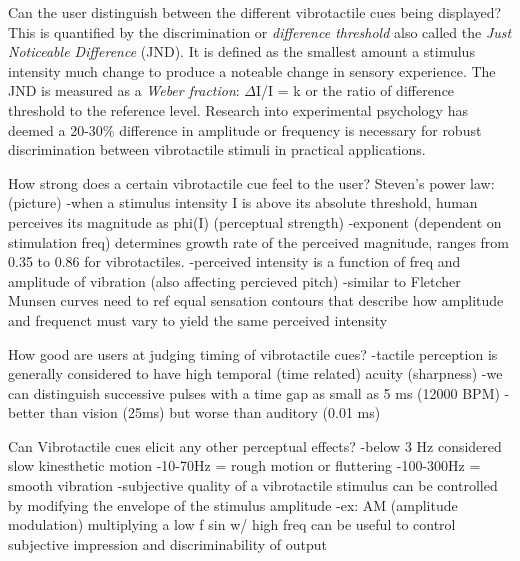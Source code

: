 Can the user distinguish between the different vibrotactile cues being displayed?
This is quantified by the discrimination or \textit{difference threshold} also called the \textit{Just Noticeable Difference} (JND). It is defined as the smallest amount a stimulus intensity much change to produce a noteable change in sensory experience. The JND is measured as a \textit{Weber fraction}:
${\Delta}$I/I = k or the ratio of difference threshold to the reference level.
Research into experimental psychology has deemed a 20-30\% difference in amplitude or frequency is necessary for robust discrimination between vibrotactile stimuli in practical applications.

How strong does a certain vibrotactile cue feel to the user?
Steven's power law: (picture)
-when a stimulus intensity I is above its absolute threshold, human perceives its magnitude as phi(I) (perceptual strength)
-exponent (dependent on stimulation freq) determines growth rate of the perceived magnitude, ranges from 0.35 to 0.86 for vibrotactiles.
-perceived intensity is a function of freq and amplitude of vibration (also affecting percieved pitch)
-similar to Fletcher Munsen curves need to ref equal sensation contours that describe how amplitude and frequenct must vary to yield the same perceived intensity

How good are users at judging timing of vibrotactile cues?
-tactile perception is generally considered to have high temporal (time related) acuity (sharpness)
-we can distinguish successive pulses with a time gap as small as 5 ms (12000 BPM)
-better than vision (25ms) but worse than auditory (0.01 ms)

Can Vibrotactile cues elicit any other perceptual effects?
-below 3 Hz considered slow kinesthetic motion
-10-70Hz = rough motion or fluttering
-100-300Hz = smooth vibration
-subjective quality of a vibrotactile stimulus can be controlled by modifying the envelope of the stimulus amplitude
-ex: AM (amplitude modulation) multiplying a low f sin w/ high freq can be useful to control subjective impression and discriminability of output


